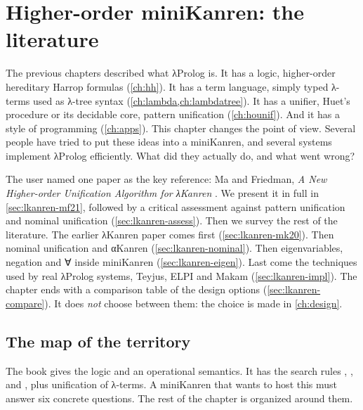 \chapter{Higher-order miniKanren: the literature}\label{ch:lkanren}

\providecommand{\lkclo}[2]{\langle #1;\,#2\rangle}
\providecommand{\lkq}{\stackrel{?}{=}}
\providecommand{\lkJust}{\mathsf{Just}}
\providecommand{\lkNothing}{\mathsf{Nothing}}
\providecommand{\lkyes}{{\ttfamily ✓}}
\providecommand{\lkno}{{\ttfamily ✗}}

The previous chapters described what λProlog is. It has a logic, higher-order hereditary Harrop
formulas (\cref{ch:hh}). It has a term language, simply typed λ-terms used as λ-tree syntax
(\cref{ch:lambda,ch:lambdatree}). It has a unifier, Huet's procedure or its decidable core, pattern
unification (\cref{ch:hounif}). And it has a style of programming (\cref{ch:apps}). This chapter
changes the point of view. Several people have tried to put these ideas into a miniKanren, and
several systems implement λProlog efficiently. What did they actually do, and what went wrong?

The user named one paper as the key reference: Ma and Friedman, \emph{A New Higher-order
Unification Algorithm for λKanren} \cite{MaFriedman2021}. We present it in full in
\cref{sec:lkanren-mf21}, followed by a critical assessment against pattern unification and nominal
unification (\cref{sec:lkanren-assess}). Then we survey the rest of the literature. The earlier
λKanren paper \cite{MaLuFriedman2020} comes first (\cref{sec:lkanren-mk20}). Then nominal unification
and αKanren \cite{UrbanPittsGabbay2004,ByrdFriedman2007} (\cref{sec:lkanren-nominal}). Then
eigenvariables, negation and ∀ inside miniKanren
\cite{HemannByrdFriedman2013,Moiseenko2019,JinEtAl2021} (\cref{sec:lkanren-eigen}). Last come the
techniques used by real λProlog systems, Teyjus, ELPI and Makam (\cref{sec:lkanren-impl}). The chapter
ends with a comparison table of the design options (\cref{sec:lkanren-compare}). It does
\emph{not} choose between them: the choice is made in \cref{ch:design}.

\section{The map of the territory}\label{sec:lkanren-map}

The book gives the logic and an operational semantics. It has the search rules ,
,  and , plus unification of λ-terms. A
miniKanren that wants to host this must answer six concrete questions. The rest of the chapter is
organized around them.

